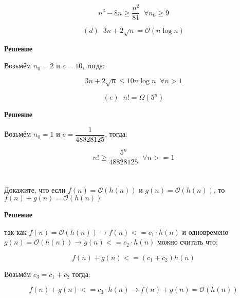 \documentclass{article}
\begin{document}
\begin{equation*}
    n^2 - 8n \geq \dfrac{n^2}{81} \;\; \forall n_0 \geq 9
\end{equation*}


\bigskip
\bigskip
\begin{equation*}
    (d) \;\; 3n + 2\sqrt{n} = \mathcal{O}(n \log n)
\end{equation*}

\textbf{Решение}

Возьмём $n_0 = 2$ и $c = 10$, тогда:

\begin{equation*}
    3n + 2\sqrt{n} \leq 10n \log n \;\; \forall n > 1
\end{equation*}




\bigskip
\bigskip
\begin{equation*}
    (e) \;\; n! = \Omega (5^n)
\end{equation*}

\textbf{Решение}

Возьмём $n_0 = 1$ и $c = \dfrac{1}{48828125}$, тогда:

\begin{equation*}
    n! \geq \dfrac{5^n}{48828125} \;\; \forall n >= 1
\end{equation*}

\section{}
Докажите, что если $f(n) = \mathcal{O}(h(n))$ и $g(n) = \mathcal{O}(h(n))$, то $f(n) + g(n) = \mathcal{O}(h(n))$

\textbf{Решение}

так как $f(n) = \mathcal{O}(h(n)) \rightarrow f(n) <= c_1\cdot h(n)$ и одновремено $g(n) = \mathcal{O}(h(n)) \rightarrow g(n) <= c_2\cdot h(n)$
можно считать что:

\begin{equation*}
    f(n) + g(n) <= (c_1 + c_2)h(n)
\end{equation*}

Возьмём $c_3 = c_1 + c_2$ тогда:

\begin{equation*}
    f(n) + g(n) <= c_3\cdot h(n) \rightarrow f(n) + g(n) = \mathcal{O}(h(n))
\end{equation*}

\section{}
\end{document}

